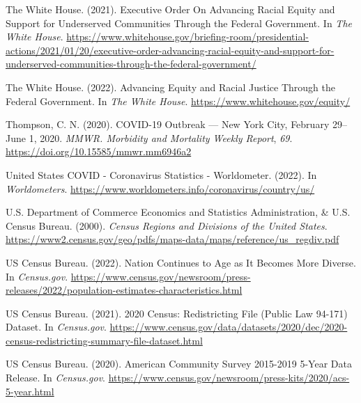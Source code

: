 \documentclass[
]{article}
\newlength{\cslhangindent}
\newlength{\cslentryspacingunit} %
\newenvironment{CSLReferences}[2] %
 {%
  \setlength{\parindent}{0pt}
  \ifodd #1
  \let\oldpar\par
  \def\par{\hangindent=\cslhangindent\oldpar}
  \fi
  \setlength{\parskip}{#2\cslentryspacingunit}
 }%
 {}
\begin{document}
\begin{CSLReferences}{1}{0}
\leavevmode{}%
The White House. (2021). Executive {Order} {On} {Advancing} {Racial} {Equity} and {Support} for {Underserved} {Communities} {Through} the {Federal} {Government}. In \emph{The White House}. \url{https://www.whitehouse.gov/briefing-room/presidential-actions/2021/01/20/executive-order-advancing-racial-equity-and-support-for-underserved-communities-through-the-federal-government/}

\leavevmode{}%
The White House. (2022). Advancing {Equity} and {Racial} {Justice} {Through} the {Federal} {Government}. In \emph{The White House}. \url{https://www.whitehouse.gov/equity/}

\leavevmode{}%
Thompson, C. N. (2020). {COVID}-19 {Outbreak} --- {New} {York} {City}, {February} 29--{June} 1, 2020. \emph{MMWR. Morbidity and Mortality Weekly Report}, \emph{69}. \url{https://doi.org/10.15585/mmwr.mm6946a2}

\leavevmode{}%
United {States} {COVID} - {Coronavirus} {Statistics} - {Worldometer}. (2022). In \emph{Worldometers}. \url{https://www.worldometers.info/coronavirus/country/us/}

\leavevmode{}%
U.S. Department of Commerce Economics and Statistics Administration, \& U.S. Census Bureau. (2000). \emph{Census {Regions} and {Divisions} of the {United} {States}}. \url{https://www2.census.gov/geo/pdfs/maps-data/maps/reference/us_regdiv.pdf}

\leavevmode{}%
US Census Bureau. (2022). Nation {Continues} to {Age} as {It} {Becomes} {More} {Diverse}. In \emph{Census.gov}. \url{https://www.census.gov/newsroom/press-releases/2022/population-estimates-characteristics.html}

\leavevmode{}%
US Census Bureau. (2021). 2020 {Census}: {Redistricting} {File} ({Public} {Law} 94-171) {Dataset}. In \emph{Census.gov}. \url{https://www.census.gov/data/datasets/2020/dec/2020-census-redistricting-summary-file-dataset.html}

\leavevmode{}%
US Census Bureau. (2020). American {Community} {Survey} 2015-2019 5-{Year} {Data} {Release}. In \emph{Census.gov}. \url{https://www.census.gov/newsroom/press-kits/2020/acs-5-year.html}


\end{CSLReferences}
\end{document}
